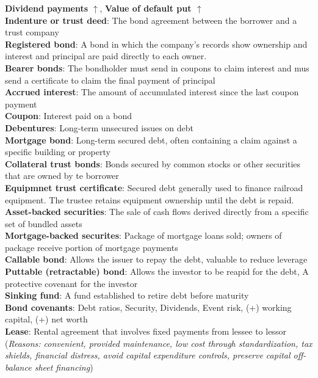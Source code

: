 \documentclass{cheatsheet}
\begin{document}
    \textbf{Dividend payments} \textbf{$\uparrow$}, \textbf{Value of default put $\uparrow$}\\
    \textbf{Indenture or trust deed}: The bond agreement between the borrower and a trust company\\
    \textbf{Registered bond}: A bond in which the company's records show ownership and interest and principal are paid directly to each owner.\\
    \textbf{Bearer bonds}: The bondholder must send in coupons to claim interest and mus send a certificate to claim the final payment of principal\\
    \textbf{Accrued interest}: The amount of accumulated interest since the last coupon payment\\
    \textbf{Coupon}: Interest paid on a bond\\
    \textbf{Debentures}: Long-term unsecured issues on debt\\
    \textbf{Mortgage bond}: Long-term secured debt, often containing a claim against a specific building or property\\
    \textbf{Collateral trust bonds}: Bonds secured by common stocks or other securities that are owned by te borrower\\
    \textbf{Equipmnet trust certificate}: Secured debt generally used to finance railroad equipment. The trustee retains equipment ownership until the debt is repaid.\\
    \textbf{Asset-backed securities}: The sale of cash flows derived directly from a specific set of bundled assets\\
    \textbf{Mortgage-backed securites}: Package of mortgage loans sold; owners of package receive portion of mortgage payments\\
    \textbf{Callable bond}: Allows the issuer to repay the debt, valuable to reduce leverage\\
    \textbf{Puttable (retractable) bond}: Allows the investor to be reapid for the debt, A protective covenant for the investor\\
    \textbf{Sinking fund}: A fund established to retire debt before maturity\\
    \textbf{Bond covenants}: Debt ratios, Security, Dividends, Event risk, (+) working capital, (+) net worth\\
    \textbf{Lease}: Rental agreement that involves fixed payments from lessee to lessor (\textit{Reasons: convenient, provided maintenance, low cost through standardization, tax shields, financial distress, avoid capital expenditure controls, preserve capital off-balance sheet financing})
\end{document}
